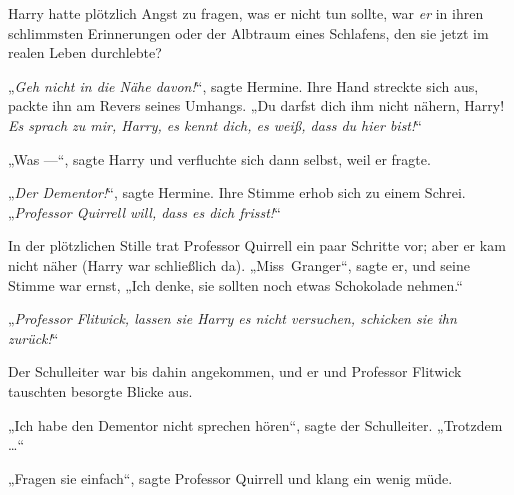Harry hatte plötzlich Angst zu fragen, was er nicht tun sollte, war \emph{er} in ihren schlimmsten Erinnerungen oder der Albtraum eines Schlafens, den sie jetzt im realen Leben durchlebte?

„\emph{Geh nicht in die Nähe davon!}“, sagte Hermine. Ihre Hand streckte sich aus, packte ihn am Revers seines Umhangs.
„Du darfst dich ihm nicht nähern, Harry! \emph{Es sprach zu mir, Harry, es kennt dich, es weiß, dass du hier bist!}“

„Was —“, sagte Harry und verfluchte sich dann selbst, weil er fragte.

„\emph{Der Dementor!}“, sagte Hermine. Ihre Stimme erhob sich zu einem Schrei.
„\emph{Professor Quirrell will, dass es dich frisst!}“

In der plötzlichen Stille trat Professor Quirrell ein paar Schritte vor; aber er kam nicht näher (Harry war schließlich da).
„Miss~Granger“, sagte er, und seine Stimme war ernst,
„Ich denke, sie sollten noch etwas Schokolade nehmen.“

„\emph{Professor Flitwick, lassen sie Harry es nicht versuchen, schicken sie ihn zurück!}“

Der Schulleiter war bis dahin angekommen, und er und Professor Flitwick tauschten besorgte Blicke aus.

„Ich habe den Dementor nicht sprechen hören“, sagte der Schulleiter.
„Trotzdem …“

„Fragen sie einfach“, sagte Professor Quirrell und klang ein wenig müde.

